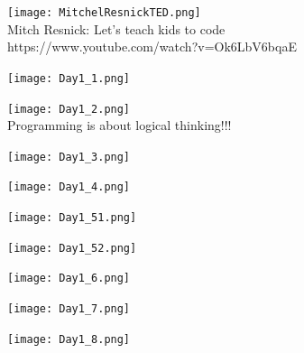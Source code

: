 \documentclass[11pt]{article}
\begin{document}
\newpage
\begin{center}
\texttt{[image: MitchelResnickTED.png]}\\
{\Huge \textsf{Mitch Resnick: Let's teach kids to code\\}}
https://www.youtube.com/watch?v=Ok6LbV6bqaE\\

\end{center}

\newpage
\begin{center}
\texttt{[image: Day1\_1.png]}\\
\end{center}

\newpage
\begin{center}
\texttt{[image: Day1\_2.png]}\\

{\huge Programming is about logical thinking!!!}
\end{center}

\newpage
\begin{center}
\texttt{[image: Day1\_3.png]}\\
\end{center}

\newpage
\begin{center}
\texttt{[image: Day1\_4.png]}\\
\end{center}

\newpage
\begin{center}
\texttt{[image: Day1\_51.png]}\\
\end{center}

\newpage
\begin{center}
\texttt{[image: Day1\_52.png]}\\
\end{center}

\newpage
\begin{center}
\texttt{[image: Day1\_6.png]}\\
\end{center}

\newpage
\begin{center}
\texttt{[image: Day1\_7.png]}\\
\end{center}

\newpage
\begin{center}
\texttt{[image: Day1\_8.png]}\\
\end{center}
\end{document}
